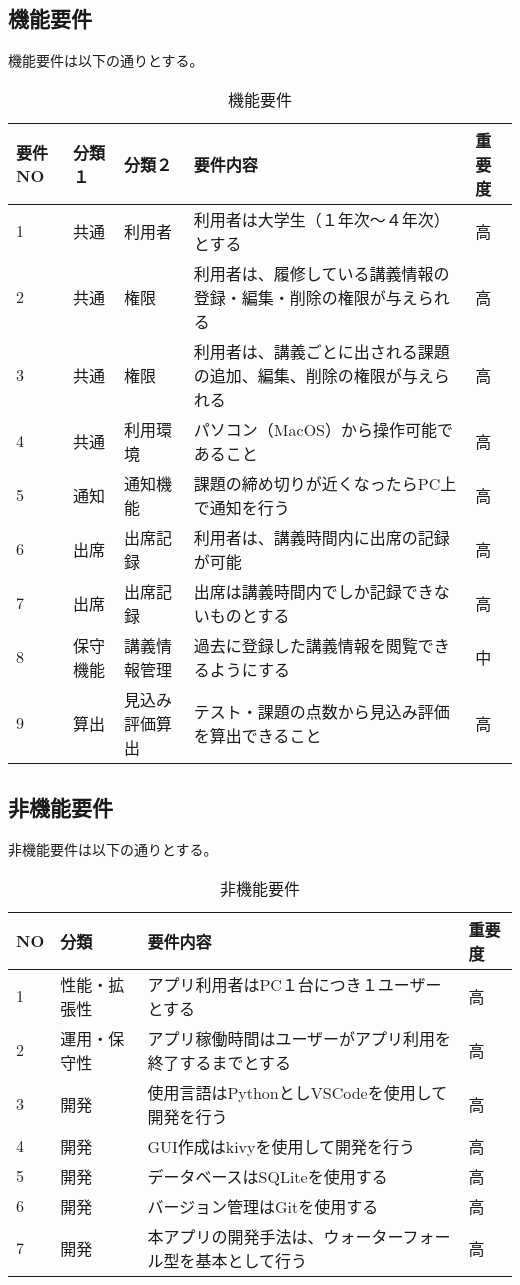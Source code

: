 \documentclass[a4paper, 11pt, titlepage]{jsarticle}
\begin{document}
\clearpage

\subsection{機能要件}
機能要件は以下の通りとする。
\begin{table}[htbp]
  \centering
  {\scriptsize
  \begin{tabular}{|l|l|l|l|l|}
    \hline
    要件NO & 分類１ & 分類２ & 要件内容 & 重要度 \\ \hline \hline
    1 & 共通 & 利用者 & 利用者は大学生（１年次〜４年次）とする & 高\\ \hline
    2 & 共通 & 権限 & 利用者は、履修している講義情報の登録・編集・削除の権限が与えられる & 高\\ \hline
    3 & 共通 & 権限 & 利用者は、講義ごとに出される課題の追加、編集、削除の権限が与えられる & 高\\ \hline
    4 & 共通 & 利用環境 & パソコン（MacOS）から操作可能であること & 高\\ \hline
    5 & 通知 & 通知機能 & 課題の締め切りが近くなったらPC上で通知を行う & 高 \\ \hline
    6 & 出席 & 出席記録 & 利用者は、講義時間内に出席の記録が可能 & 高\\ \hline
    7 & 出席 & 出席記録 & 出席は講義時間内でしか記録できないものとする & 高\\ \hline
    8 & 保守機能 & 講義情報管理 & 過去に登録した講義情報を閲覧できるようにする & 中 \\ \hline
    9 & 算出 & 見込み評価算出 & テスト・課題の点数から見込み評価を算出できること & 高 \\ \hline
  \end{tabular}
  }
  \caption{機能要件}
  \label{tb:kinou}
\end{table}

\subsection{非機能要件}
非機能要件は以下の通りとする。
\begin{table}[htbp]
  \centering
  {\scriptsize
  \begin{tabular}{|l|l|l|l|}
    \hline
    NO & 分類 & 要件内容 & 重要度 \\ \hline \hline
    1 & 性能・拡張性 & アプリ利用者はPC１台につき１ユーザーとする & 高\\ \hline
    2 & 運用・保守性 & アプリ稼働時間はユーザーがアプリ利用を終了するまでとする & 高\\ \hline
    3 & 開発 & 使用言語はPythonとしVSCodeを使用して開発を行う & 高\\ \hline
    4 & 開発 & GUI作成はkivyを使用して開発を行う & 高 \\ \hline
    5 & 開発 & データベースはSQLiteを使用する & 高 \\ \hline
    6 & 開発 & バージョン管理はGitを使用する & 高\\ \hline
    7 & 開発 & 本アプリの開発手法は、ウォーターフォール型を基本として行う & 高\\ \hline
  \end{tabular}
  }
  \caption{非機能要件}
  \label{tb:n-kinou}
\end{table}
\end{document}
